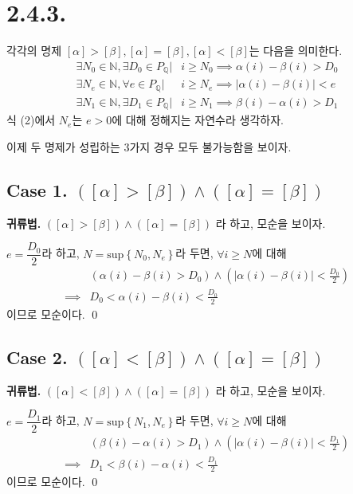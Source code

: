 \documentclass{article}
\begin{document}
\section{2.4.3.}
각각의 명제 $[\alpha] > [\beta], [\alpha] = [\beta], [\alpha] < [\beta]$는 다음을 의미한다.
\begin{align*}
\exists N_0 \in \mathbb{N}, \exists D_0 \in P_\mathbb{Q} \bigg|& i \ge N_0 \implies \alpha(i) - \beta(i) > D_0 \tag{1}\\
\exists N_e \in \mathbb{N}, \forall e \in P_\mathbb{Q} \bigg|& i \ge N_e \implies \left|\alpha(i) - \beta(i)\right| < e \tag{2}\\
\exists N_1 \in \mathbb{N}, \exists D_1 \in P_\mathbb{Q} \bigg|& i \ge N_1 \implies \beta(i) - \alpha(i) > D_1 \tag{3}
\end{align*}
식 (2)에서 $N_e$는 $e > 0$에 대해 정해지는 자연수라 생각하자.

이제 두 명제가 성립하는 3가지 경우 모두 불가능함을 보이자.
\subsection{Case 1. $([\alpha] > [\beta] )\wedge( [\alpha] = [\beta])$}
\textbf{귀류법.} $([\alpha] > [\beta] )\wedge( [\alpha] = [\beta])$ 라 하고, 모순을 보이자.

$e = \dfrac{D_0}{2}$라 하고, $N = \text{sup}\left\{N_0, N_e\right\}$라 두면, $\forall i \ge N$에 대해
\begin{align*}
&\left( \alpha(i) - \beta(i) > D_0 \right) \wedge \left( \left| \alpha(i) - \beta(i) \right| < \frac{D_0}{2}\right) \\
\implies & D_0 < \alpha(i) - \beta(i) < \frac{D_0}{2}
\end{align*}이므로 모순이다. \qed
\subsection{Case 2. $([\alpha] < [\beta] )\wedge( [\alpha] = [\beta])$}
\textbf{귀류법.} $([\alpha] < [\beta] )\wedge( [\alpha] = [\beta])$ 라 하고, 모순을 보이자.

$e = \dfrac{D_1}{2}$라 하고, $N = \text{sup}\left\{N_1, N_e\right\}$라 두면, $\forall i \ge N$에 대해
\begin{align*}
&\left( \beta(i) - \alpha(i) > D_1 \right) \wedge \left( \left| \alpha(i) - \beta(i) \right| < \frac{D_1}{2}\right) \\
\implies & D_1 < \beta(i) - \alpha(i) < \frac{D_1}{2}
\end{align*}이므로 모순이다. \qed
\end{document}
